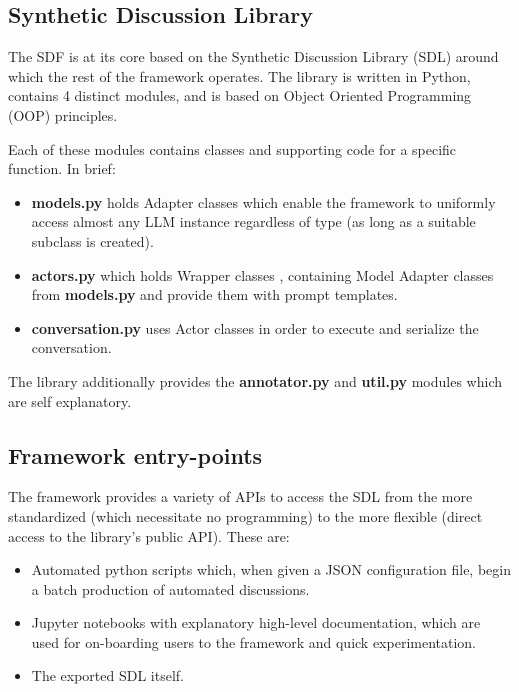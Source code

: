 \subsection{Synthetic Discussion Library}
\label{ssec:system:library}

The SDF is at its core based on the Synthetic Discussion Library (SDL) around which the rest of the framework operates. The library is written in Python, contains 4 distinct modules, and is based on Object Oriented Programming (OOP) principles.

Each of these modules contains classes and supporting code for a specific function. In brief:

\begin{itemize}
	\item \textbf{models.py} holds Adapter classes \cite{gamma1995design} which enable the framework to uniformly access almost any LLM instance regardless of type (as long as a suitable subclass is created).
	
	\item \textbf{actors.py} which holds Wrapper classes \cite{gamma1995design}, containing Model Adapter classes from \textbf{models.py} and provide them with prompt templates.
	
	\item \textbf{conversation.py} uses Actor classes in order to execute and serialize the conversation.
\end{itemize}

The library additionally provides the \textbf{annotator.py} and \textbf{util.py} modules which are self explanatory.


\subsection{Framework entry-points}
\label{ssec:system:entrypoints}

The framework provides a variety of APIs to access the SDL from the more standardized (which necessitate no programming) to the more flexible (direct access to the library's public API). These are:

\begin{itemize}
	\item Automated python scripts which, when given a JSON configuration file, begin a batch production of automated discussions.
	
	\item Jupyter notebooks with explanatory high-level documentation, which are used for on-boarding users to the framework and quick experimentation.
	
	\item The exported SDL itself.
\end{itemize}


